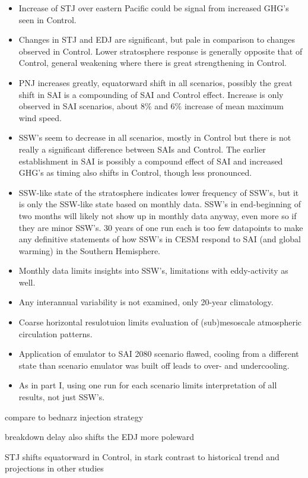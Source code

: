 \begin{itemize}
    \item Increase of STJ over eastern Pacific could be signal from increased GHG's seen in Control.
    \item Changes in STJ and EDJ are significant, but pale in comparison to changes observed in Control. Lower stratosphere response is generally opposite that of Control, general weakening where there is great strengthening in Control.
    \item PNJ increases greatly, equatorward shift in all scenarios, possibly the great shift in SAI is a compounding of SAI and Control effect. Increase is only observed in SAI scenarios, about 8\% and 6\% increase of mean maximum wind speed.
    \item SSW's seem to decrease in all scenarios, mostly in Control but there is not really a significant difference between SAIs and Control. The earlier establishment in SAI is possibly a compound effect of SAI and increased GHG's as timing also shifts in Control, though less pronounced.
    \item SSW-like state of the stratosphere indicates lower frequency of SSW's, but it is only the SSW-like state based on monthly data. SSW's in end-beginning of two months will likely not show up in monthly data anyway, even more so if they are minor SSW's. 30 years of one run each is too few datapoints to make any definitive statements of how SSW's in CESM respond to SAI (and global warming) in the Southern Hemisphere. 
    \item Monthly data limits insights into SSW's, limitations with eddy-activity as well.
    \item Any interannual variability is not examined, only 20-year climatology.
    \item Coarse horizontal resulotuion limits evaluation of (sub)mesoscale atmospheric circulation patterns.
    \item Application of emulator to SAI 2080 scenario flawed, cooling from a different state than scenario emulator was built off leads to over- and undercooling.
    \item As in part I, using one run for each scenario limits interpretation of all results, not just SSW's.
\end{itemize}

compare to bednarz injection strategy 

breakdown delay also shifts the EDJ more poleward \parencite{ceppi2019}

STJ shifts equatorward in Control, in stark contrast to historical trend and projections in other studies \parencite{chenoli2017historical}